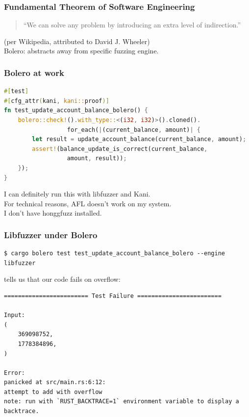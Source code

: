 \documentclass{beamer}
\newenvironment{changemargin}[1]{%
  \begin{list}{}{%
    \setlength{\topsep}{0pt}%
    \setlength{\leftmargin}{#1}%
    \setlength{\rightmargin}{1em}
    \setlength{\listparindent}{\parindent}%
    \setlength{\itemindent}{\parindent}%
    \setlength{\parsep}{\parskip}%
  }%
  \item[]}{\end{list}}
\begin{document}
\begin{frame}[fragile]
  \frametitle{Fundamental Theorem of Software Engineering}
  \Large
  \begin{quote}
    ``We can solve any problem by introducing an extra level of indirection.''
  \end{quote}
  \begin{changemargin}{2cm}
    (per Wikipedia, attributed to David J. Wheeler)\\[1em]

    Bolero: abstracts away from specific fuzzing engine.
  \end{changemargin}
\end{frame}

\begin{frame}[fragile]
  \frametitle{Bolero at work}
\begin{lstlisting}[language=Rust,basicstyle=\scriptsize]
#[test]
#[cfg_attr(kani, kani::proof)]
fn test_update_account_balance_bolero() {
    bolero::check!().with_type::<(i32, i32)>().cloned().
                  for_each(|(current_balance, amount)| {
        let result = update_account_balance(current_balance, amount);
        assert!(balance_update_is_correct(current_balance, 
                  amount, result));
    });
}
\end{lstlisting}
\begin{changemargin}{1cm}
  \Large
  I can definitely run this with libfuzzer and Kani. \\
  For technical reasons, AFL doesn't work on my system.\\
  I don't have honggfuzz installed.
\end{changemargin}

\end{frame}

\begin{frame}[fragile]
  \frametitle{Libfuzzer under Bolero}
{ \scriptsize \begin{verbatim}
$ cargo bolero test test_update_account_balance_bolero --engine libfuzzer
\end{verbatim} }

\hspace*{2cm} tells us that our code fails on overflow:

\scriptsize
\begin{verbatim}
======================== Test Failure ========================

Input: 
(
    369098752,
    1778384896,
)

Error: 
panicked at src/main.rs:6:12:
attempt to add with overflow
note: run with `RUST_BACKTRACE=1` environment variable to display a backtrace.
\end{verbatim}
\end{frame}
\end{document}
